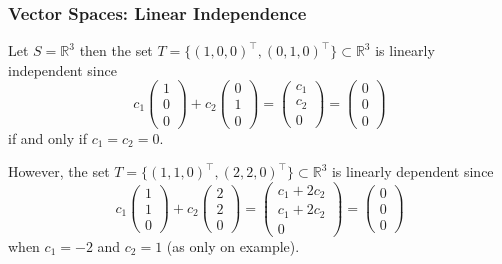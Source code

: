 \documentclass{beamer}
\begin{document}
\begin{frame}\frametitle{Vector Spaces: Linear Independence}

\begin{example}  Let $S=\mathbb{R}^3$ then the set $T=\{ (1,0,0)^\top, (0, 1, 0)^\top \} \subset \mathbb{R}^3$ is linearly independent since
\[
c_1\begin{pmatrix} 1 \\ 0 \\ 0 \end{pmatrix} + c_2\begin{pmatrix} 0 \\ 1 \\ 0 \end{pmatrix} = \begin{pmatrix} c_1 \\ c_2 \\ 0 \end{pmatrix} = \begin{pmatrix} 0 \\ 0 \\ 0 \end{pmatrix}
\]
if and only if $c_1=c_2=0$.  

However, the set $T=\{ (1,1,0)^\top, (2, 2, 0)^\top \} \subset \mathbb{R}^3$ is linearly dependent since
\[
c_1\begin{pmatrix} 1 \\ 1 \\ 0 \end{pmatrix} + c_2\begin{pmatrix} 2 \\ 2 \\ 0 \end{pmatrix} = \begin{pmatrix} c_1+2c_2 \\ c_1+2c_2 \\ 0 \end{pmatrix} = \begin{pmatrix} 0 \\ 0 \\ 0 \end{pmatrix}
\]
when $c_1=-2$ and $c_2=1$ (as only on example).
\end{example}
\end{frame}
\end{document}
